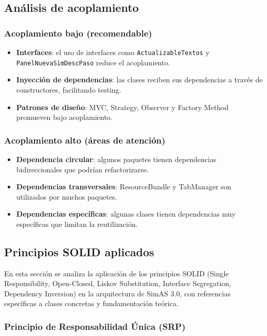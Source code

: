 \subsection{Análisis de acoplamiento}

\subsubsection{Acoplamiento bajo (recomendable)}
\begin{itemize}
    \item \textbf{Interfaces}: el uso de interfaces como \texttt{ActualizableTextos} y \texttt{PanelNuevaSimDescPaso} reduce el acoplamiento.
    \item \textbf{Inyección de dependencias}: las clases reciben sus dependencias a través de constructores, facilitando testing.
    \item \textbf{Patrones de diseño}: MVC, Strategy, Observer y Factory Method promueven bajo acoplamiento.
\end{itemize}

\subsubsection{Acoplamiento alto (áreas de atención)}
\begin{itemize}
    \item \textbf{Dependencia circular}: algunos paquetes tienen dependencias bidireccionales que podrían refactorizarse.
    \item \textbf{Dependencias transversales}: ResourceBundle y TabManager son utilizados por muchos paquetes.
    \item \textbf{Dependencias específicas}: algunas clases tienen dependencias muy específicas que limitan la reutilización.
\end{itemize}

\subsection{Principios SOLID aplicados}

En esta sección se analiza la aplicación de los principios SOLID (Single Responsibility, Open-Closed, Liskov Substitution, Interface Segregation, Dependency Inversion) en la arquitectura de SimAS 3.0, con referencias específicas a clases concretas y fundamentación teórica.

\subsubsection{Principio de Responsabilidad Única (SRP)}

